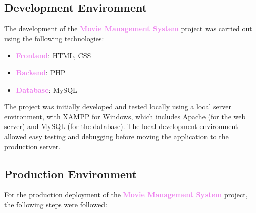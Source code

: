 \documentclass[a4paper,12pt]{article}  %
\renewcommand{\textbf}[1]{\textcolor{violet}{\bfseries #1}}
\begin{document}
\subsection{Development Environment}
The development of the \textbf{Movie Management System} project was carried out using the following technologies:
\begin{itemize}
    \item \textbf{Frontend}: HTML, CSS
    \item \textbf{Backend}: PHP
    \item \textbf{Database}: MySQL
\end{itemize}

The project was initially developed and tested locally using a local server environment, with XAMPP for Windows, which includes Apache (for the web server) and MySQL (for the database). The local development environment allowed easy testing and debugging before moving the application to the production server.

\subsection{Production Environment}
For the production deployment of the \textbf{Movie Management System} project, the following steps were followed:
\end{document}
